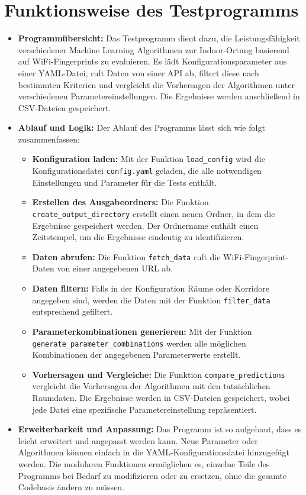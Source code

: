 \section{Funktionsweise des Testprogramms}
\begin{itemize}
    \item \textbf{Programmübersicht:} Das Testprogramm dient dazu, die Leistungsfähigkeit verschiedener Machine Learning Algorithmen zur Indoor-Ortung basierend auf WiFi-Fingerprints zu evaluieren. Es lädt Konfigurationsparameter aus einer YAML-Datei, ruft Daten von einer API ab, filtert diese nach bestimmten Kriterien und vergleicht die Vorhersagen der Algorithmen unter verschiedenen Parametereinstellungen. Die Ergebnisse werden anschließend in CSV-Dateien gespeichert.

    \item \textbf{Ablauf und Logik:} Der Ablauf des Programms lässt sich wie folgt zusammenfassen:
        \begin{itemize}
            \item \textbf{Konfiguration laden:} Mit der Funktion \texttt{load\_config} wird die Konfigurationsdatei \texttt{config.yaml} geladen, die alle notwendigen Einstellungen und Parameter für die Tests enthält.
            \item \textbf{Erstellen des Ausgabeordners:} Die Funktion \texttt{create\_output\_directory} erstellt einen neuen Ordner, in dem die Ergebnisse gespeichert werden. Der Ordnername enthält einen Zeitstempel, um die Ergebnisse eindeutig zu identifizieren.
            \item \textbf{Daten abrufen:} Die Funktion \texttt{fetch\_data} ruft die WiFi-Fingerprint-Daten von einer angegebenen URL ab.
            \item \textbf{Daten filtern:} Falls in der Konfiguration Räume oder Korridore angegeben sind, werden die Daten mit der Funktion \texttt{filter\_data} entsprechend gefiltert.
            \item \textbf{Parameterkombinationen generieren:} Mit der Funktion \texttt{gene\allowbreak rate\_para\allowbreak meter\_\allowbreak com\allowbreak bi\allowbreak nations} werden alle möglichen Kombinationen der angegebenen Parameterwerte erstellt.
            \item \textbf{Vorhersagen und Vergleiche:} Die Funktion \texttt{compare\_predictions} vergleicht die Vorhersagen der Algorithmen mit den tatsächlichen Raumdaten. Die Ergebnisse werden in CSV-Dateien gespeichert, wobei jede Datei eine spezifische Parametereinstellung repräsentiert.
        \end{itemize}

    \item \textbf{Erweiterbarkeit und Anpassung:} Das Programm ist so aufgebaut, dass es leicht erweitert und angepasst werden kann. Neue Parameter oder Algorithmen können einfach in die YAML-Konfigurationsdatei hinzugefügt werden. Die modularen Funktionen ermöglichen es, einzelne Teile des Programms bei Bedarf zu modifizieren oder zu ersetzen, ohne die gesamte Codebasis ändern zu müssen.
\end{itemize}

